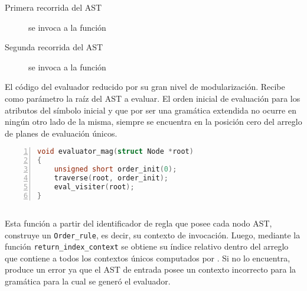 \begin{description}
\item [Primera recorrida del AST] se invoca a la función

\item [Segunda recorrida del AST] se invoca a la función
\end{description}

El código del evaluador reducido por su gran nivel de modularización. Recibe como parámetro la raíz del AST a evaluar. El orden inicial de evaluación para los atributos del símbolo inicial y que por ser una gramática extendida no ocurre en ningún otro lado de la misma, siempre se encuentra en la posición cero del arreglo de planes de evaluación únicos.

\vspace*{0.2cm}
\begin{lstlisting}[language=C++, basicstyle=\scriptsize, numbers=left, columns=fullflexible, linewidth=6cm]
void evaluator_mag(struct Node *root)
{
    unsigned short order_init(0);
    traverse(root, order_init);
    eval_visiter(root);
}
\end{lstlisting}
\vspace*{0.2cm}

\subsection*{}

Esta función a partir del identificador de regla que posee cada nodo AST, construye un \texttt{Order\_rule}, es decir, su contexto de invocación. Luego, mediante la función \texttt{return\_index\_context} se obtiene su índice relativo dentro del arreglo que contiene a todos los contextos únicos computados por \maggen. Si no lo encuentra, produce un error ya que el AST de entrada posee un contexto incorrecto para la gramática para la cual se generó el evaluador.

